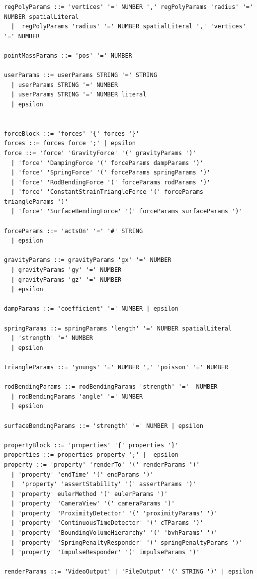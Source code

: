 \begin{verbatim}
regPolyParams ::= 'vertices' '=' NUMBER ',' regPolyParams 'radius' '=' NUMBER spatialLiteral
  |  regPolyParams 'radius' '=' NUMBER spatialLiteral ',' 'vertices' '=' NUMBER

pointMassParams ::= 'pos' '=' NUMBER

userParams ::= userParams STRING '=' STRING 
  | userParams STRING '=' NUMBER 
  | userParams STRING '=' NUMBER literal
  | epsilon


forceBlock ::= 'forces' '{' forces '}'
forces ::= forces force ';' | epsilon
force ::= 'force' 'GravityForce' '(' gravityParams ')' 
  | 'force' 'DampingForce '(' forceParams dampParams ')' 
  | 'force' 'SpringForce' '(' forceParams springParams ')' 
  | 'force' 'RodBendingForce '(' forceParams rodParams ')' 
  | 'force' 'ConstantStrainTriangleForce '(' forceParams triangleParams ')' 
  | 'force' 'SurfaceBendingForce' '(' forceParams surfaceParams ')' 

forceParams ::= 'actsOn' '=' '#' STRING
  | epsilon

gravityParams ::= gravityParams 'gx' '=' NUMBER
  | gravityParams 'gy' '=' NUMBER
  | gravityParams 'gz' '=' NUMBER
  | epsilon

dampParams ::= 'coefficient' '=' NUMBER | epsilon

springParams ::= springParams 'length' '=' NUMBER spatialLiteral
  | 'strength' '=' NUMBER
  | epsilon

triangleParams ::= 'youngs' '=' NUMBER ',' 'poisson' '=' NUMBER

rodBendingParams ::= rodBendingParams 'strength' '='  NUMBER
  | rodBendingParams 'angle' '=' NUMBER
  | epsilon

surfaceBendingParams ::= 'strength' '=' NUMBER | epsilon

propertyBlock ::= 'properties' '{' properties '}'
properties ::= properties property ';' |  epsilon
property ::= 'property' 'renderTo' '(' renderParams ')' 
  | 'property' 'endTime' '(' endParams ')' 
  |  'property' 'assertStability' '(' assertParams ')' 
  | 'property' eulerMethod '(' eulerParams ')' 
  | 'property' 'CameraView' '(' cameraParams ')' 
  | 'property' 'ProximityDetector' '(' 'proximityParams' ')' 
  | 'property' 'ContinuousTimeDetector' '(' cTParams ')'
  | 'property' 'BoundingVolumeHierarchy' '(' 'bvhParams' ')'
  | 'property' 'SpringPenaltyResponder' '(' springPenaltyParams ')'
  | 'property' 'ImpulseResponder' '(' impulseParams ')'

renderParams ::= 'VideoOutput' | 'FileOutput' '(' STRING ')' | epsilon


\end{verbatim}
